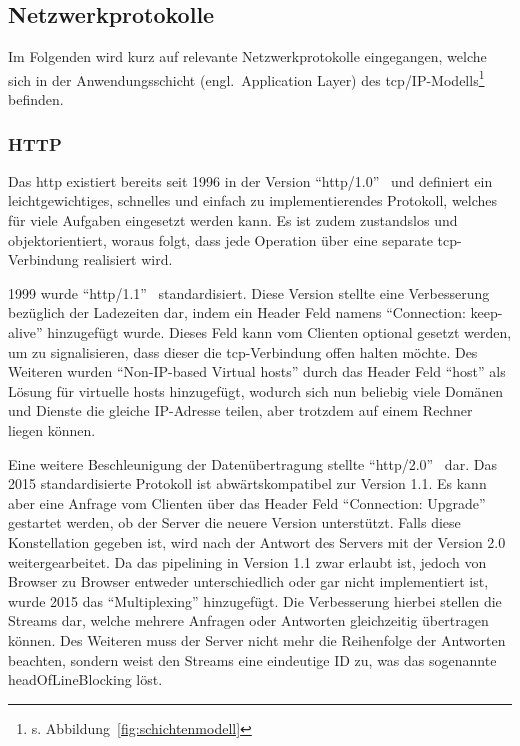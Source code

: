 \subsection{Netzwerkprotokolle}\label{subsec:netzwerkprotokolle}
	Im Folgenden wird kurz auf relevante Netzwerkprotokolle eingegangen,
	welche sich in der Anwendungsschicht (engl.\ Application Layer) des
	\gls{tcp}/IP-Modells\footnote{s. Abbildung~\ref{fig:schichtenmodell}} befinden.

	\subsubsection{HTTP}\label{subsubsec:http}
		Das \gls{http} existiert bereits seit 1996 in der Version \enquote{\gls{http}/1.0}~\cite[Vgl.][]{rfc1945}
		und definiert ein leichtgewichtiges, schnelles und einfach zu implementierendes Protokoll,
		welches für viele Aufgaben eingesetzt werden kann.
		Es ist zudem zustandslos und objektorientiert, woraus folgt, dass
		jede Operation über eine separate \gls{tcp}-Verbindung realisiert wird.

		1999 wurde \enquote{\gls{http}/1.1}~\cite[Vgl.][]{rfc7230} standardisiert.
		Diese Version stellte eine Verbesserung bezüglich der Ladezeiten dar,
		indem ein Header Feld namens \enquote{Connection: keep-alive} hinzugefügt wurde.
		Dieses Feld kann vom Clienten optional gesetzt werden, um zu signalisieren,
		dass dieser die \gls{tcp}-Verbindung offen halten möchte.
		Des Weiteren wurden \enquote{Non-IP-based Virtual \glspl{host}} durch das Header Feld \enquote{\gls{host}}
		als Lösung für virtuelle \glspl{host} hinzugefügt,
		wodurch sich nun beliebig viele Domänen und Dienste die gleiche IP-Adresse teilen,
		aber trotzdem auf einem Rechner liegen können.

		Eine weitere Beschleunigung der Datenübertragung stellte \enquote{\gls{http}/2.0}~\cite[Vgl.][]{rfc7540} dar.
		Das 2015 standardisierte Protokoll ist abwärtskompatibel zur Version 1.1.
		Es kann aber eine Anfrage vom Clienten über das Header Feld \enquote{Connection: Upgrade} gestartet werden,
		ob der Server die neuere Version unterstützt.
		Falls diese Konstellation gegeben ist, wird nach der Antwort des Servers mit der Version 2.0 weitergearbeitet.
		Da das \gls{pipelining} in Version 1.1 zwar erlaubt ist,
		jedoch von Browser zu Browser entweder unterschiedlich oder gar nicht implementiert ist,
		wurde 2015 das \enquote{Multiplexing} hinzugefügt.
		Die Verbesserung hierbei stellen die Streams dar,
		welche mehrere Anfragen oder Antworten gleichzeitig übertragen können.
		Des Weiteren muss der Server nicht mehr die Reihenfolge der Antworten beachten,
		sondern weist den Streams eine eindeutige ID zu,
		was das sogenannte \gls{headOfLineBlocking} löst.

